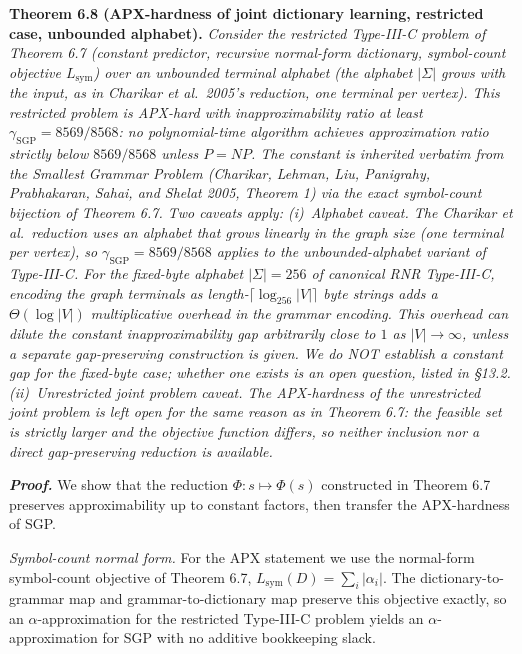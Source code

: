 \documentclass[
]{article}
\begin{document}
\textbf{Theorem 6.8 (APX-hardness of joint
dictionary learning, restricted case, unbounded alphabet).}
\emph{Consider the restricted Type-III-C problem of Theorem 6.7
(constant predictor, recursive normal-form dictionary, symbol-count
objective $L_{\mathrm{sym}}$) over an \emph{unbounded terminal
alphabet} (the alphabet $|\Sigma|$ grows with the input, as in
Charikar et al.\ 2005's reduction, one terminal per vertex). This
restricted problem is APX-hard with inapproximability ratio at least
$\gamma_{\mathrm{SGP}} = 8569/8568$: no polynomial-time algorithm
achieves approximation ratio strictly below $8569/8568$ unless
$P = NP$. The constant is inherited verbatim from the Smallest
Grammar Problem (Charikar, Lehman, Liu, Panigrahy, Prabhakaran,
Sahai, and Shelat 2005, Theorem 1) via the exact symbol-count
bijection of Theorem 6.7. Two caveats apply:
(i)~\emph{Alphabet caveat.} The Charikar et al.\ reduction uses an
alphabet that grows linearly in the graph size (one terminal per
vertex), so $\gamma_{\mathrm{SGP}} = 8569/8568$ applies to the
\emph{unbounded-alphabet} variant of Type-III-C. For the fixed-byte
alphabet $|\Sigma| = 256$ of canonical RNR Type-III-C, encoding the
graph terminals as length-$\lceil \log_{256} |V| \rceil$ byte
strings adds a $\Theta(\log |V|)$ multiplicative overhead in the
grammar encoding. This overhead can dilute the constant
inapproximability gap arbitrarily close to $1$ as $|V| \to \infty$,
unless a separate gap-preserving construction is given. We do NOT
establish a constant gap for the fixed-byte case; whether one
exists is an open question, listed in §13.2. (ii)~\emph{Unrestricted joint problem caveat.} The
APX-hardness of the unrestricted joint problem is left open for the
same reason as in Theorem 6.7: the feasible set is strictly larger
and the objective function differs, so neither inclusion nor a
direct gap-preserving reduction is available.}

\emph{\textbf{Proof.}} We show that the reduction
$\Phi: s \mapsto \Phi(s)$ constructed in Theorem 6.7 preserves
approximability up to constant factors, then transfer the
APX-hardness of SGP.

\emph{Symbol-count normal form.} For the APX statement we use the
normal-form symbol-count objective of Theorem 6.7,
$L_{\mathrm{sym}}(D) = \sum_i |\alpha_i|$. The dictionary-to-grammar
map and grammar-to-dictionary map preserve this objective exactly, so
an $\alpha$-approximation for the restricted Type-III-C problem yields
an $\alpha$-approximation for SGP with no additive bookkeeping slack.
\end{document}
